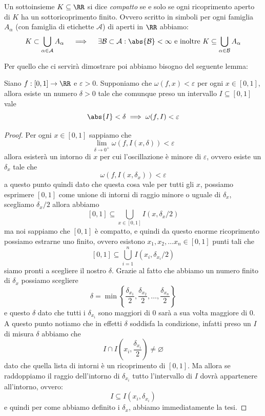\documentclass[11pt]{scrartcl}
\newcommand{\eset}{\varnothing}
\begin{document}
	 \begin{definition}
	 	Un sottoinsieme $K\subseteq \RR$ si dice \textit{compatto} se e solo se ogni ricoprimento aperto di $K$ ha un sottoricoprimento finito. Ovvero scritto in simboli per ogni famiglia $A_\alpha$ (con famiglia di etichette $\mathcal{A}$) di aperti in $\RR$ abbiamo:
	 	$$K\subset \bigcup_{\alpha\in \mathcal{A}}A_\alpha \quad\implies\quad \exists \mathcal{B}\subset\mathcal{A}:\abs{\mathcal{B}}<\infty\text{  e inoltre }K\subseteq \bigcup_{\alpha\in\mathcal{B}}A_\alpha $$
	 \end{definition}
	 Per quello che ci servirà dimostrare poi abbiamo bisogno del seguente lemma:
	 \begin{lemma}
	 	Siano $f:[0,1]\to \RR$ e $\varepsilon>0$. Supponiamo che $\omega(f,x)<\varepsilon$ per ogni $x\in[0,1]$, allora esiste un numero $\delta>0$ tale che comunque preso un intervallo $I\subseteq[0,1]$ vale 
	 	$$\abs{I}<\delta \implies \omega(f,I)<\varepsilon$$  
	 \end{lemma}
	 \begin{proof}
	 	Per ogni $x\in [0,1]$ sappiamo che 
	 	$$\lim_{\delta\to 0^+}\omega(f,I(x,\delta))<\varepsilon$$
	 	allora esisterà un intorno di $x$ per cui l'oscillazione è minore di $\varepsilon$, ovvero esiste un $\delta_x$ tale che
	 	$$\omega(f,I(x,\delta_x))<\varepsilon$$
	 	a questo punto quindi dato che questa cosa vale per tutti gli $x$, possiamo esprimere $[0,1]$ come unione di intorni di raggio minore o uguale di $\delta_x$, scegliamo $\delta_x/2$ allora abbiamo
	 	$$[0,1]\subseteq \bigcup_{x\in[0,1]}I\left(x,\delta_x/2\right)$$
	 	ma noi sappiamo che $[0,1]$ è compatto, e quindi da questo enorme ricoprimento possiamo estrarne uno finito, ovvero esistono $x_1,x_2,\dots x_n\in [0,1]$ punti tali che
	 	$$[0,1]\subseteq \bigcup_{i=1}^n I\left(x_i,\delta_{x_i}/2\right)$$ 
	 	siamo pronti a scegliere il nostro $\delta$. Grazie al fatto che abbiamo un numero finito di $\delta_x$ possiamo scegliere
	 	$$\delta=\min\left\{\frac{\delta_{x_1}}{2},\frac{\delta_{x_2}}{2},\dots,\frac{\delta_{x_n}}{2}\right\}$$
	 	e questo $\delta$ dato che tutti i $\delta_{x_i}$ sono maggiori di $0$ sarà a sua volta maggiore di $0$. A questo punto notiamo che in effetti $\delta$ soddisfa la condizione, infatti preso un $I$ di misura $\delta$ abbiamo che 
	 	$$I\cap I(x_i,\frac{\delta_{x_i}}{2})\ne \eset$$
	 	dato che quella lista di intorni è un ricoprimento di $[0,1]$. Ma allora se raddoppiamo il raggio dell'intorno di $\delta_{x_i}$ tutto l'intervallo di $I$ dovrà appartenere all'intorno, ovvero:
	 	$$I\subseteq I(x_i,\delta_{x_i})$$
	 	e quindi per come abbiamo definito i $\delta_x$, abbiamo immediatamente la tesi.
	 \end{proof}
\end{document}

